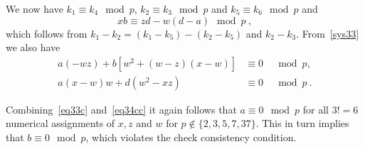  We now have $k_1 \equiv k_4 \mod p$, $k_2
\equiv k_3 \mod p$ and $k_5 \equiv k_6 \mod p$ and
\begin{equation}\label{eq34c}
xb \equiv zd -w(d-a) \mod p~,
\end{equation}
which follows from $k_1-k_2=(k_1-k_5)-(k_2-k_5)$ and $k_2-k_3$.
From~\eqref{sys33} we also have
\begin{equation}\label{eq34cc}\begin{array}{cccc}
a(-wz)+b[w^2+(w-z)(x-w)] &\equiv 0&\mod p,\\
a(x-w)w+d(w^2-xz) &\equiv 0&\mod p~.
\end{array}\end{equation}


Combining~\eqref{eq33c} and~\eqref{eq34cc} it again follows that $a
\equiv 0 \mod p$ for all $3!=6$ numerical assignments of $x,z$ and
$w$ for $p \notin \{2,3,5,7,37\}$. This in turn implies that $b
\equiv 0 \mod p$, which violates the check consistency condition.
